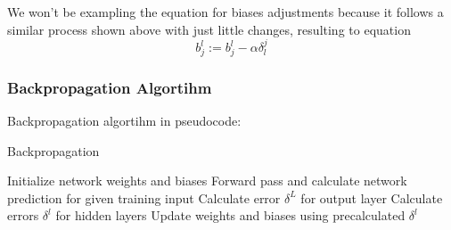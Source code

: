 We won't be exampling the equation for biases adjustments because it follows a similar process shown above with just little changes, resulting to equation
\begin{equation} \label{eq:14}
	b_{j}^l := b_{j}^l - \alpha\delta_l^{j}
\end{equation}

\subsubsection{Backpropagation Algortihm}

Backpropagation algortihm in pseudocode:

\begin{algorithm}
\caption{Backpropagation}\label{euclid}
\begin{algorithmic}[1]
\State Initialize network weights and biases
	\State Forward pass and calculate network prediction for given training input
	\State Calculate error $\delta^L$ for output layer
	\State Calculate errors $\delta^l$ for hidden layers
	\State Update weights and biases using precalculated $\delta^l$
\EndFor
\end{algorithmic}
\end{algorithm}
